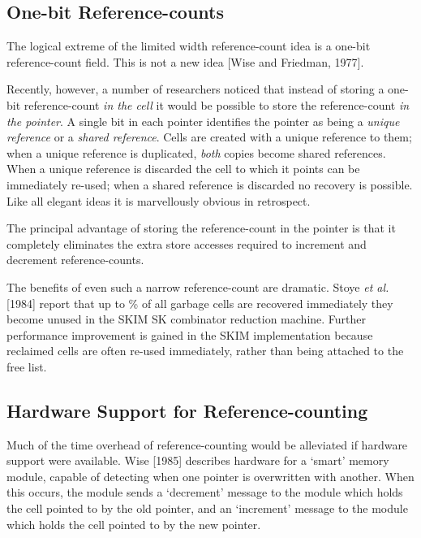     \subsection{One-bit Reference-counts}

    The logical extreme of the limited width reference-count idea is a one-bit
    reference-count field. This is not a new idea [Wise and Friedman, 1977].

    Recently, however, a number of researchers noticed that instead of storing
    a one-bit reference-count \textit{in the cell} it would be possible to store the reference-count \textit{in the pointer}. A single bit in each pointer identifies the pointer as being
    a \textit{unique reference} or a \textit{shared reference}. Cells are created with a unique
    reference to them; when a unique reference is duplicated, \textit{both} copies become
    shared references. When a unique reference is discarded the cell to which it
    points can be immediately re-used; when a shared reference is discarded no
    recovery is possible. Like all elegant ideas it is marvellously obvious in
    retrospect.

    The principal advantage of storing the reference-count in the pointer is that
    it completely eliminates the extra store accesses required to increment and
    decrement reference-counts.

    The benefits of even such a narrow reference-count are dramatic. Stoye \textit{et
        al.} [1984] report that up to \% of all garbage cells are recovered immediately
    they become unused in the SKIM SK combinator reduction machine. Further
    performance improvement is gained in the SKIM implementation because
    reclaimed cells are often re-used immediately, rather than being attached to
    the free list.

    \subsection{Hardware Support for Reference-counting}

    Much of the time overhead of reference-counting would be alleviated if
    hardware support were available. Wise [1985] describes hardware for a
    `smart' memory module, capable of detecting when one pointer is overwritten
    with another. When this occurs, the module sends a `decrement' message to
    the module which holds the cell pointed to by the old pointer, and an
    `increment' message to the module which holds the cell pointed to by the new
    pointer.

